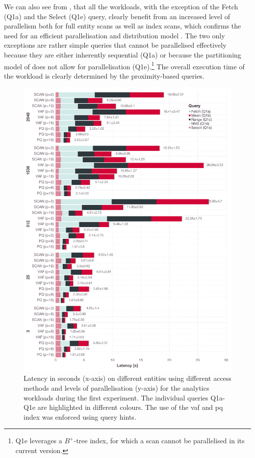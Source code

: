 We can also see from , that all the workloads, with the exception of the Fetch (Q1a) and the Select (Q1e) query, clearly benefit from an increased level of parallelism both for full entity scans as well as index scans, which confirms the need for an efficient parallelisation and distribution model \cite{Giangreco:2018Database}. The two only exceptions are rather simple queries that cannot be parallelised effectively because they are either inherently sequential (Q1a) or because the partitioning model of \cottontail{} does not allow for parallelisation (Q1e).\footnote{Q1e leverages a $B^+$-tree index, for which a scan cannot be parallelised in its current version.} The overall execution time of the workload is clearly determined by the proximity-based queries.

\begin{figure}[p]
    \centering
    \includegraphics[width=\textwidth]{figures/analytics/analytics-cottontail-runtime}
    \caption {Latency in seconds (x-axis) on different entities using different access methods and levels of parallelisation (y-axis) for the analytics workloads during the first experiment. The individual queries Q1a-Q1e are highlighted in different colours. The use of the \acrshort{vaf} and \acrshort{pq} index was enforced using query hints.}
    \label{figure:analytics_cottontail_runtime}
\end{figure}


